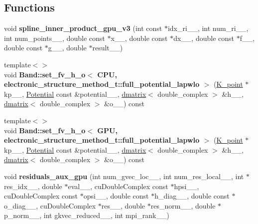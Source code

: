 \subsection*{Functions}
\begin{DoxyCompactItemize}
\item 
\hypertarget{namespacesirius_a3cef7c512b088723d79cae0ae83ea90f}{}void {\bfseries spline\+\_\+inner\+\_\+product\+\_\+gpu\+\_\+v3} (int const $\ast$idx\+\_\+ri\+\_\+\+\_\+, int num\+\_\+ri\+\_\+\+\_\+, int num\+\_\+points\+\_\+\+\_\+, double const $\ast$x\+\_\+\+\_\+, double const $\ast$dx\+\_\+\+\_\+, double const $\ast$f\+\_\+\+\_\+, double const $\ast$g\+\_\+\+\_\+, double $\ast$result\+\_\+\+\_\+)\label{namespacesirius_a3cef7c512b088723d79cae0ae83ea90f}

\item 
\hypertarget{namespacesirius_a0d07eff6dce992401b2217d6dbefce52}{}{\footnotesize template$<$$>$ }\\void {\bfseries Band\+::set\+\_\+fv\+\_\+h\+\_\+o$<$ C\+P\+U, electronic\+\_\+structure\+\_\+method\+\_\+t\+::full\+\_\+potential\+\_\+lapwlo $>$} (\hyperlink{classsirius_1_1_k__point}{K\+\_\+point} $\ast$kp\+\_\+\+\_\+, \hyperlink{classsirius_1_1_potential}{Potential} const \&potential\+\_\+\+\_\+, \hyperlink{classsddk_1_1dmatrix}{dmatrix}$<$ double\+\_\+complex $>$ \&h\+\_\+\+\_\+, \hyperlink{classsddk_1_1dmatrix}{dmatrix}$<$ double\+\_\+complex $>$ \&o\+\_\+\+\_\+) const \label{namespacesirius_a0d07eff6dce992401b2217d6dbefce52}

\item 
\hypertarget{namespacesirius_adb13e13ade4471edd379bf67e51b4e4d}{}{\footnotesize template$<$$>$ }\\void {\bfseries Band\+::set\+\_\+fv\+\_\+h\+\_\+o$<$ G\+P\+U, electronic\+\_\+structure\+\_\+method\+\_\+t\+::full\+\_\+potential\+\_\+lapwlo $>$} (\hyperlink{classsirius_1_1_k__point}{K\+\_\+point} $\ast$kp\+\_\+\+\_\+, \hyperlink{classsirius_1_1_potential}{Potential} const \&potential\+\_\+\+\_\+, \hyperlink{classsddk_1_1dmatrix}{dmatrix}$<$ double\+\_\+complex $>$ \&h\+\_\+\+\_\+, \hyperlink{classsddk_1_1dmatrix}{dmatrix}$<$ double\+\_\+complex $>$ \&o\+\_\+\+\_\+) const \label{namespacesirius_adb13e13ade4471edd379bf67e51b4e4d}

\item 
\hypertarget{namespacesirius_ab4bf5abc2403d4247352c2c74cc3c32b}{}void {\bfseries residuals\+\_\+aux\+\_\+gpu} (int num\+\_\+gvec\+\_\+loc\+\_\+\+\_\+, int num\+\_\+res\+\_\+local\+\_\+\+\_\+, int $\ast$res\+\_\+idx\+\_\+\+\_\+, double $\ast$eval\+\_\+\+\_\+, cu\+Double\+Complex const $\ast$hpsi\+\_\+\+\_\+, cu\+Double\+Complex const $\ast$opsi\+\_\+\+\_\+, double const $\ast$h\+\_\+diag\+\_\+\+\_\+, double const $\ast$o\+\_\+diag\+\_\+\+\_\+, cu\+Double\+Complex $\ast$res\+\_\+\+\_\+, double $\ast$res\+\_\+norm\+\_\+\+\_\+, double $\ast$p\+\_\+norm\+\_\+\+\_\+, int gkvec\+\_\+reduced\+\_\+\+\_\+, int mpi\+\_\+rank\+\_\+\+\_\+)\label{namespacesirius_ab4bf5abc2403d4247352c2c74cc3c32b}


\end{DoxyCompactItemize}
